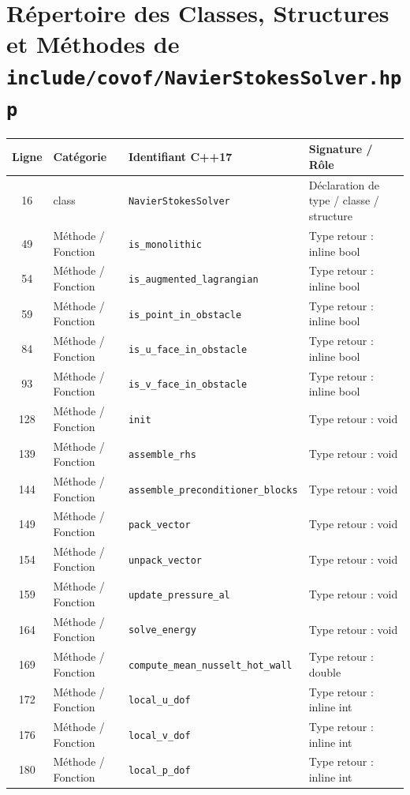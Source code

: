 \documentclass[10pt,a4paper,oneside]{book}
\begin{document}
\section{Répertoire des Classes, Structures et Méthodes de \texttt{include/covof/NavierStokesSolver.hpp}}
\begin{center}\small
\begin{tabular}{clll}
\toprule
\textbf{Ligne} & \textbf{Catégorie} & \textbf{Identifiant C++17} & \textbf{Signature / Rôle} \\
\midrule
16 & class & \texttt{NavierStokesSolver} & Déclaration de type / classe / structure \\
49 & Méthode / Fonction & \texttt{is\_monolithic} & Type retour : inline bool \\
54 & Méthode / Fonction & \texttt{is\_augmented\_lagrangian} & Type retour : inline bool \\
59 & Méthode / Fonction & \texttt{is\_point\_in\_obstacle} & Type retour : inline bool \\
84 & Méthode / Fonction & \texttt{is\_u\_face\_in\_obstacle} & Type retour : inline bool \\
93 & Méthode / Fonction & \texttt{is\_v\_face\_in\_obstacle} & Type retour : inline bool \\
128 & Méthode / Fonction & \texttt{init} & Type retour : void \\
139 & Méthode / Fonction & \texttt{assemble\_rhs} & Type retour : void \\
144 & Méthode / Fonction & \texttt{assemble\_preconditioner\_blocks} & Type retour : void \\
149 & Méthode / Fonction & \texttt{pack\_vector} & Type retour : void \\
154 & Méthode / Fonction & \texttt{unpack\_vector} & Type retour : void \\
159 & Méthode / Fonction & \texttt{update\_pressure\_al} & Type retour : void \\
164 & Méthode / Fonction & \texttt{solve\_energy} & Type retour : void \\
169 & Méthode / Fonction & \texttt{compute\_mean\_nusselt\_hot\_wall} & Type retour : double \\
172 & Méthode / Fonction & \texttt{local\_u\_dof} & Type retour : inline int \\
176 & Méthode / Fonction & \texttt{local\_v\_dof} & Type retour : inline int \\
180 & Méthode / Fonction & \texttt{local\_p\_dof} & Type retour : inline int \\
\bottomrule
\end{tabular}
\end{center}
\end{document}
